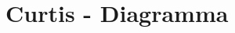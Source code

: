 \documentclass[a4paper, 15pt]{article}
\begin{document}
\section{Curtis - Diagramma}
	
\end{document}
